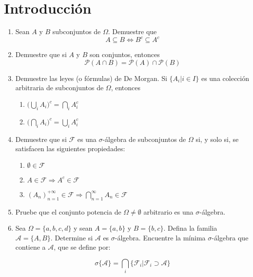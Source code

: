 \section{Introducción}

\begin{enumerate}
	\item Sean $A$ y $B$ subconjuntos de $\Omega$. Demuestre que
	\[
	A \subseteq B \Longleftrightarrow B^c \subseteq A^c
	\]
	
	\item Demuestre que si $A$ y $B$ son conjuntos, entonces
	\[
	\mathcal{P}(A \cap B) = \mathcal{P}(A) \cap \mathcal{P}(B)
	\]
	
	
	\item Demuestre las leyes (o fórmulas) de De Morgan. Si $\{ A_i | i \in I\}$ es una colección arbitraria de subconjuntos de $\Omega$, entonces
	\begin{enumerate}
		\item $\Big( \bigcup_{i} A_i \Big)^c = \bigcap_{i} A_i^c$
		\item $\Big( \bigcap_{i} A_i \Big)^c = \bigcup_{i} A_i^c$
	\end{enumerate}
	
	
	\item Demuestre que si $\mathcal{F}$ es una $\sigma$-álgebra de subconjuntos de $\Omega$ si, y solo si, se satisfacen las siguientes propiedades:
	\begin{enumerate}
		\item $\emptyset \in \mathcal{F}$ 
		\item $A \in \mathcal{F} \Longrightarrow A^{c} \in \mathcal{F}$
		\item $(A_n)_{n=1}^{+\infty} \in \mathcal{F} \Longrightarrow \bigcap\limits_{n=1}^{\infty} A_n \in \mathcal{F}$
	\end{enumerate}
	
	
	
	
	\item Pruebe que el conjunto potencia de $\Omega \not= \emptyset$ arbitrario es una $\sigma$-álgebra.
	
	\item Sea $\Omega = \{a,b,c,d\}$ y sean $A=\{a,b\}$ y $B = \{b,c\}$. Defina la familia $\mathcal{A} = \{A,B\}$. Determine si $\mathcal{A}$ es $\sigma$-álgebra. Encuentre la mínima $\sigma$-álgebra que contiene a $\mathcal{A}$, que se define por:
	
	\[
	\sigma\{\mathcal{A}\} = \bigcap_i \{ \mathcal{F}_i | \mathcal{F}_i \supset \mathcal{A} \}
	\]
	

\end{enumerate}
